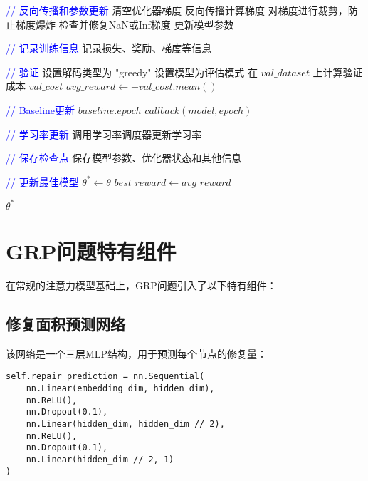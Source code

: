\documentclass[10pt,a4paper]{article}
\begin{document}
\begin{algorithm}[h]
\begin{algorithmic}[1]
                \State \textcolor{blue}{// 反向传播和参数更新}
                \State 清空优化器梯度
                \State 反向传播计算梯度
                \State 对梯度进行裁剪，防止梯度爆炸
                \State 检查并修复NaN或Inf梯度
                \State 更新模型参数
                
                \State \textcolor{blue}{// 记录训练信息}
                    \State 记录损失、奖励、梯度等信息
                \EndIf
            \EndFor
            
            \State \textcolor{blue}{// 验证}
            \State 设置解码类型为 "greedy"
            \State 设置模型为评估模式
            \State 在 $val\_dataset$ 上计算验证成本 $val\_cost$
            \State $avg\_reward \leftarrow -val\_cost.mean()$
            
            \State \textcolor{blue}{// Baseline更新}
            \State $baseline.epoch\_callback(model, epoch)$
            
            \State \textcolor{blue}{// 学习率更新}
            \State 调用学习率调度器更新学习率
            
            \State \textcolor{blue}{// 保存检查点}
                \State 保存模型参数、优化器状态和其他信息
            \EndIf
            
            \State \textcolor{blue}{// 更新最佳模型}
                \State $\theta^* \leftarrow \theta$
                \State $best\_reward \leftarrow avg\_reward$
            \EndIf
        \EndFor
        
        \State \Return $\theta^*$
    \end{algorithmic}
\end{algorithm}

\section{GRP问题特有组件}

在常规的注意力模型基础上，GRP问题引入了以下特有组件：

\subsection{修复面积预测网络}
该网络是一个三层MLP结构，用于预测每个节点的修复量：
\begin{verbatim}
self.repair_prediction = nn.Sequential(
    nn.Linear(embedding_dim, hidden_dim),
    nn.ReLU(),
    nn.Dropout(0.1),            
    nn.Linear(hidden_dim, hidden_dim // 2),
    nn.ReLU(),
    nn.Dropout(0.1),
    nn.Linear(hidden_dim // 2, 1)
)
\end{verbatim}
\end{document}
